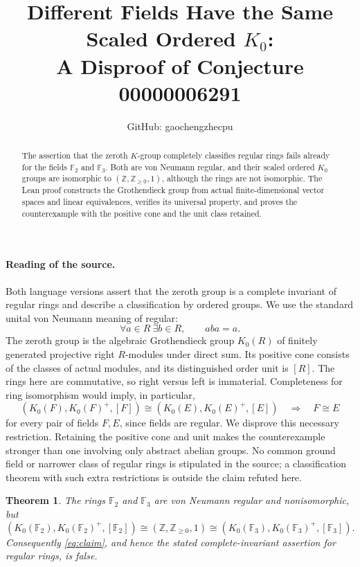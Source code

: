 \documentclass[11pt]{article}
\title{Different Fields Have the Same Scaled Ordered $K_0$:\\
A Disproof of Conjecture 00000006291}
\author{GitHub: gaochengzhecpu}
\date{}
\newtheorem{theorem}{Theorem}
\newcommand{\Fp}{\mathbb F}
\begin{document}
\maketitle
\begin{abstract}
The assertion that the zeroth $K$-group completely classifies regular rings
fails already for the fields $\Fp_2$ and $\Fp_3$. Both are von Neumann regular,
and their scaled ordered $K_0$ groups are isomorphic to
$(\mathbb Z,\mathbb Z_{\geq0},1)$, although the rings are not isomorphic.
The Lean proof constructs the Grothendieck group from actual finite-dimensional
vector spaces and linear equivalences, verifies its universal property, and
proves the counterexample with the positive cone and the unit class retained.
\end{abstract}

\paragraph{Reading of the source.}
Both language versions assert that the zeroth group is a complete invariant
of regular rings and describe a classification by ordered groups.
We use the standard unital von Neumann meaning of regular:
\[
 \forall a\in R\ \exists b\in R,\qquad aba=a.
\]
The zeroth group is the algebraic Grothendieck group $K_0(R)$ of finitely
generated projective right $R$-modules under direct sum. Its positive cone
consists of the classes of actual modules, and its distinguished order unit
is $[R]$. The rings here are commutative, so right versus left is immaterial.
Completeness for ring isomorphism would imply, in particular,
\begin{equation}\label{eq:claim}
 (K_0(F),K_0(F)^+,[F])\cong(K_0(E),K_0(E)^+,[E])
 \quad\Longrightarrow\quad F\cong E
\end{equation}
for every pair of fields $F,E$, since fields are regular.
We disprove this necessary restriction. Retaining the positive cone and
unit makes the counterexample stronger than one involving only abstract
abelian groups. No common ground field or narrower class of regular rings
is stipulated in the source; a classification theorem with such extra
restrictions is outside the claim refuted here.

\begin{theorem}\label{thm:main}
The rings $\Fp_2$ and $\Fp_3$ are von Neumann regular and nonisomorphic, but
\[
 (K_0(\Fp_2),K_0(\Fp_2)^+,[\Fp_2])
 \cong(\mathbb Z,\mathbb Z_{\geq0},1)
 \cong(K_0(\Fp_3),K_0(\Fp_3)^+,[\Fp_3]).
\]
Consequently \eqref{eq:claim}, and hence the stated complete-invariant
assertion for regular rings, is false.
\end{theorem}
\end{document}
